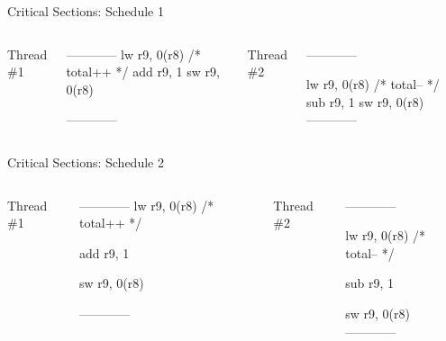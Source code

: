 \documentclass[11pt,aspectratio=169]{beamer}
\begin{document}
\begin{slide}{Critical Sections: Schedule 1}
\begin{columns}
    Thread \#1\\
    \begin{ccode}
------------
lw r9, 0(r8) /* total++ */
add r9, 1
sw r9, 0(r8)



------------
    \end{ccode}
    Thread \#2\\
    \begin{ccode}
------------



lw r9, 0(r8) /* total-- */
sub r9, 1
sw r9, 0(r8)
------------
    \end{ccode}
\end{columns}
\end{slide}

\begin{slide}{Critical Sections: Schedule 2}
\begin{columns}
    Thread \#1\\
    \begin{ccode}
------------
lw r9, 0(r8) /* total++ */

add r9, 1

sw r9, 0(r8)

------------
    \end{ccode}
    Thread \#2\\
    \begin{ccode}
------------

lw r9, 0(r8) /* total-- */

sub r9, 1

sw r9, 0(r8)
------------
    \end{ccode}
\end{columns}
\end{slide}
\end{document}
